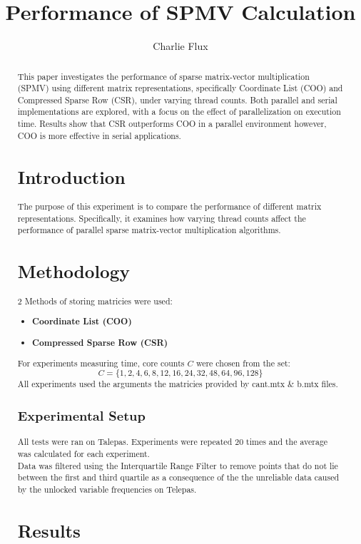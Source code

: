 \documentclass[conference]{IEEEtran}
\title{Performance of SPMV Calculation}
\author{Charlie Flux}
\begin{document}
\maketitle

\begin{abstract}
This paper investigates the performance of sparse matrix-vector multiplication (SPMV) using different matrix representations, specifically Coordinate List (COO) and Compressed Sparse Row (CSR), under varying thread counts.
Both parallel and serial implementations are explored, with a focus on the effect of parallelization on execution time.
Results show that CSR outperforms COO in a parallel environment however, COO is more effective in serial applications.
\section{Introduction}
The purpose of this experiment is to compare the performance of different matrix representations. Specifically, it examines how varying thread counts affect the performance of parallel sparse matrix-vector multiplication algorithms.
\section{Methodology}
2 Methods of storing matricies were used:
\begin{itemize}
    \item \textbf{Coordinate List (COO)}
    \item \textbf{Compressed Sparse Row (CSR)} 
\end{itemize}

For experiments measuring time, core counts \(C\) were chosen from the set:
    \[
    C = \{1, 2, 4, 6, 8, 12, 16, 24, 32, 48, 64, 96, 128\}
    \]
All experiments used the arguments the matricies provided by cant.mtx \& b.mtx files.
\subsection{Experimental Setup}
All tests were ran on Talepas. Experiments were repeated 20 times and the average was calculated for each experiment. \\
Data was filtered using the Interquartile Range Filter to remove points that do not lie between the first and third quartile as a consequence of the the unreliable data caused by the unlocked variable frequencies on Telepas.

\section{Results}


\end{abstract}
\end{document}
